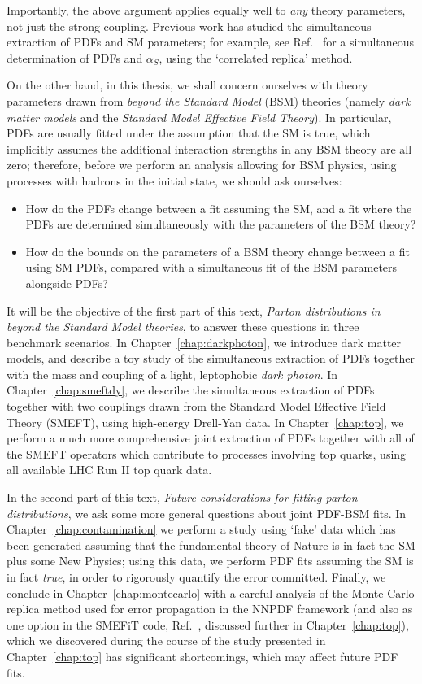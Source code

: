 \documentclass[withindex,glossary]{cam-thesis}
\begin{document}
\noindent Importantly, the above argument applies equally well to \textit{any} theory parameters, not just the strong coupling. Previous work has studied the simultaneous extraction of PDFs and SM parameters; for example, see Ref.~\cite{Ball:2018iqk} for a simultaneous determination of PDFs and $\alpha_S$, using the `correlated replica' method.

On the other hand, in this thesis, we shall concern ourselves with theory parameters drawn from \textit{beyond the Standard Model} (BSM) theories (namely \textit{dark matter models} and the \textit{Standard Model Effective Field Theory}). In particular, PDFs are usually fitted under the assumption that the SM is true, which implicitly assumes the additional interaction strengths in any BSM theory are all zero; therefore, before we perform an analysis allowing for BSM physics, using processes with hadrons in the initial state, we should ask ourselves:
\begin{itemize}
\item How do the PDFs change between a fit assuming the SM, and a fit where the PDFs are determined simultaneously with the parameters of the BSM theory?
\item How do the bounds on the parameters of a BSM theory change between a fit using SM PDFs, compared with a simultaneous fit of the BSM parameters alongside PDFs?
\end{itemize}

It will be the objective of the first part of this text, \textit{Parton distributions in beyond the Standard Model theories}, to answer these questions in three benchmark scenarios. In Chapter~\ref{chap:darkphoton}, we introduce dark matter models, and describe a toy study of the simultaneous extraction of PDFs together with the mass and coupling of a light, leptophobic \textit{dark photon}. In Chapter~\ref{chap:smeftdy}, we describe the simultaneous extraction of PDFs together with two couplings drawn from the Standard Model Effective Field Theory (SMEFT), using high-energy Drell-Yan data. In Chapter~\ref{chap:top}, we perform a much more comprehensive joint extraction of PDFs together with all of the SMEFT operators which contribute to processes involving top quarks, using all available LHC Run II top quark data.

In the second part of this text, \textit{Future considerations for fitting parton distributions}, we ask some more general questions about joint PDF-BSM fits. In Chapter~\ref{chap:contamination} we perform a study using `fake' data which has been generated assuming that the fundamental theory of Nature is in fact the SM plus some New Physics; using this data, we perform PDF fits assuming the SM is in fact \textit{true}, in order to rigorously quantify the error committed. Finally, we conclude in Chapter~\ref{chap:montecarlo} with a careful analysis of the Monte Carlo replica method used for error propagation in the NNPDF framework (and also as one option in the SMEFiT code, Ref.~\cite{Giani:2023gfq}, discussed further in Chapter~\ref{chap:top}), which we discovered during the course of the study presented in Chapter~\ref{chap:top} has significant shortcomings, which may affect future PDF fits.
\end{document}
